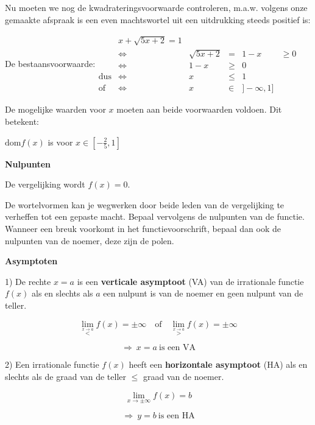 \medskip{}


Nu moeten we nog de kwadrateringsvoorwaarde controleren, m.a.w. volgens
onze gemaakte afspraak is een even machtswortel uit een uitdrukking
steeds positief is:

De bestaansvoorwaarde:${\displaystyle \begin{array}{cccclc}
 & x+\sqrt{5x+2}=1\\
 & \Longleftrightarrow & \sqrt{5x+2} & = & 1-x & \geq0\\
 & \Longleftrightarrow & 1-x & \geq & 0\\
\textrm{dus} & \Longleftrightarrow & x & \leq & 1\\
\textrm{of} & \Longleftrightarrow & x & \in & ]-\infty,1]
\end{array}}$\medskip{}


De mogelijke waarden voor $x$ moeten aan beide voorwaarden voldoen.
Dit betekent:

${\displaystyle \textrm{dom}f(x)}$ is voor $x\in[-\frac{2}{5},1]$ 

\medskip{}


\noindent \textbf{Nulpunten}

De vergelijking wordt $f(x)=0$.

De wortelvormen kan je wegwerken door beide leden van de vergelijking
te verheffen tot een gepaste macht. Bepaal vervolgens de nulpunten
van de functie. Wanneer een breuk voorkomt in het functievoorschrift,
bepaal dan ook de nulpunten van de noemer, deze zijn de polen.

\medskip{}


\noindent \textbf{Asymptoten}

1) De rechte $x=a$ is een \textbf{verticale asymptoot} (VA) van de
irrationale functie $f(x)$ als en slechts als $a$ een nulpunt is
van de noemer en geen nulpunt van de teller.

\[
{\displaystyle {\displaystyle \lim_{\overset{x\rightarrow a}{<}}}f(x)=\pm\infty\quad\textrm{of}\quad{\displaystyle \lim_{\overset{x\rightarrow a}{>}}}f(x)=\pm\infty}
\]


\[
{\displaystyle \Rightarrow\:x=a\:\textrm{is een VA}}
\]
\medskip{}


2) Een irrationale functie $f(x)$ heeft een \textbf{horizontale asymptoot}
(HA) als en slechts als de graad van de teller \ensuremath{\le} graad
van de noemer.

\[
{\displaystyle {\displaystyle \lim_{x\to\pm\infty}}f(x)=b}
\]


\[
{\displaystyle \Rightarrow\:y=b\:\textrm{is een HA}}
\]
\medskip{}


